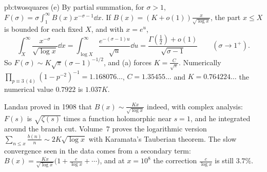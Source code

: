 \begin{solution}{pb:twosquares}
(e) By partial summation, for $\sigma>1$, $F(\sigma)=\sigma\int_1^\infty B(x)x^{-\sigma-1}\dd x$. If $B(x)=(K+o(1))\frac x{\sqrt{\log x}}$, the part $x\le X$ is bounded for each fixed $X$, and
with $x=e^u$,
\[
\int_X^\infty\frac{x^{-\sigma}}{\sqrt{\log x}}\dd x=\int_{\log X}^\infty\frac{e^{-(\sigma-1)u}}{\sqrt u}\dd u=\frac{\Gamma(\frac12)+o(1)}{\sqrt{\sigma-1}}\qquad(\sigma\to1^+).
\]
So $F(\sigma)\sim K\sqrt\pi(\sigma-1)^{-1/2}$, and (a) forces $K=\frac C{\sqrt\pi}$. Numerically $\prod_{p\equiv3\,(4)}(1-p^{-2})^{-1}=1.168076\ldots$, $C=1.35455\ldots$ and $K=0.764224\ldots$
the numerical value $0.7922$ is $1.037K$.


\leads Landau proved in 1908 that $B(x)\sim\frac{Kx}{\sqrt{\log x}}$ indeed, with complex analysis: $F(s)$ is $\sqrt{\zeta(s)}$ times a function holomorphic near $s=1$, and he integrated
around the branch cut. Volume~7 proves the logarithmic version $\sum_{n\le x}\frac{b(n)}n\sim2K\sqrt{\log x}$ with Karamata's Tauberian theorem. The slow convergence seen in the
data comes from a secondary term: $B(x)=\frac{Kx}{\sqrt{\log x}}\bigl(1+\frac{c}{\log x}+\cdots\bigr)$, and at $x=10^8$ the correction $\frac c{\log x}$ is still $3.7\%$.
\end{solution}

